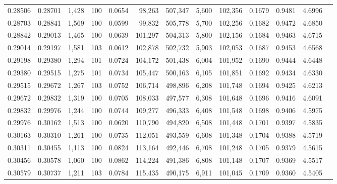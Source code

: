 \begin{tabular}{rrrrrrrrrrrrr}
0.28506 & 0.28701 & 1,428 & 100 &                                     0.0654 &  98,263 & 507,347 &   5,600 & 102,356 & 0.1679 & 0.9481 & 4.6996 \\
0.28703 & 0.28841 & 1,569 & 100 &                                     0.0599 &  99,832 & 505,778 &   5,700 & 102,256 & 0.1682 & 0.9472 & 4.6850 \\
0.28842 & 0.29013 & 1,465 & 100 &                                     0.0639 & 101,297 & 504,313 &   5,800 & 102,156 & 0.1684 & 0.9463 & 4.6715 \\
0.29014 & 0.29197 & 1,581 & 103 &                                     0.0612 & 102,878 & 502,732 &   5,903 & 102,053 & 0.1687 & 0.9453 & 4.6568 \\
0.29198 & 0.29380 & 1,294 & 101 &                                     0.0724 & 104,172 & 501,438 &   6,004 & 101,952 & 0.1690 & 0.9444 & 4.6448 \\
0.29380 & 0.29515 & 1,275 & 101 &                                     0.0734 & 105,447 & 500,163 &   6,105 & 101,851 & 0.1692 & 0.9434 & 4.6330 \\
0.29515 & 0.29672 & 1,267 & 103 &                                     0.0752 & 106,714 & 498,896 &   6,208 & 101,748 & 0.1694 & 0.9425 & 4.6213 \\
0.29672 & 0.29832 & 1,319 & 100 &                                     0.0705 & 108,033 & 497,577 &   6,308 & 101,648 & 0.1696 & 0.9416 & 4.6091 \\
0.29832 & 0.29976 & 1,244 & 100 &                                     0.0744 & 109,277 & 496,333 &   6,408 & 101,548 & 0.1698 & 0.9406 & 4.5975 \\
0.29976 & 0.30162 & 1,513 & 100 &                                     0.0620 & 110,790 & 494,820 &   6,508 & 101,448 & 0.1701 & 0.9397 & 4.5835 \\
0.30163 & 0.30310 & 1,261 & 100 &                                     0.0735 & 112,051 & 493,559 &   6,608 & 101,348 & 0.1704 & 0.9388 & 4.5719 \\
0.30311 & 0.30455 & 1,113 & 100 &                                     0.0824 & 113,164 & 492,446 &   6,708 & 101,248 & 0.1705 & 0.9379 & 4.5615 \\
0.30456 & 0.30578 & 1,060 & 100 &                                     0.0862 & 114,224 & 491,386 &   6,808 & 101,148 & 0.1707 & 0.9369 & 4.5517 \\
0.30579 & 0.30737 & 1,211 & 103 &                                     0.0784 & 115,435 & 490,175 &   6,911 & 101,045 & 0.1709 & 0.9360 & 4.5405 \\

\end{tabular}
